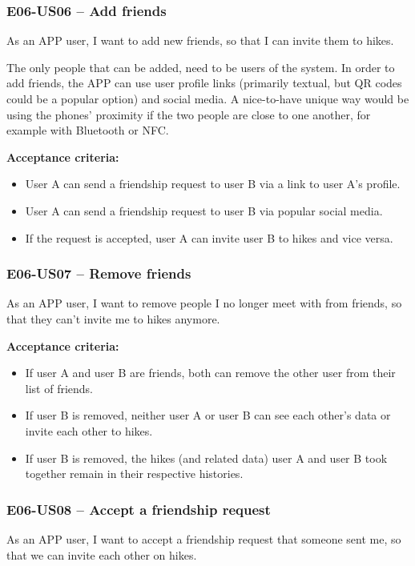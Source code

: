 
\subsubsection*{E06-US06 -- Add friends}
As an APP user, I want to add new friends, so that I can invite them to hikes.

The only people that can be added, need to be users of the system.
In order to add friends, the APP can use user profile links (primarily textual, but QR codes could be a popular option) and social media.
A nice-to-have unique way would be using the phones' proximity if the two people are close to one another, for example with Bluetooth or NFC.

\textbf{Acceptance criteria:}
\begin{itemize}
    \item User A can send a friendship request to user B via a link to user A's profile.
    \item User A can send a friendship request to user B via popular social media.
    \item If the request is accepted, user A can invite user B to hikes and vice versa.
\end{itemize}

\subsubsection*{E06-US07 -- Remove friends}
As an APP user, I want to remove people I no longer meet with from friends, so that they can't invite me to hikes anymore.

\textbf{Acceptance criteria:}
\begin{itemize}
    \item If user A and user B are friends, both can remove the other user from their list of friends.
    \item If user B is removed, neither user A or user B can see each other's data or invite each other to hikes.
    \item If user B is removed, the hikes (and related data) user A and user B took together remain in their respective histories.
\end{itemize}

\subsubsection*{E06-US08 -- Accept a friendship request}
As an APP user, I want to accept a friendship request that someone sent me, so that we can invite each other on hikes.

